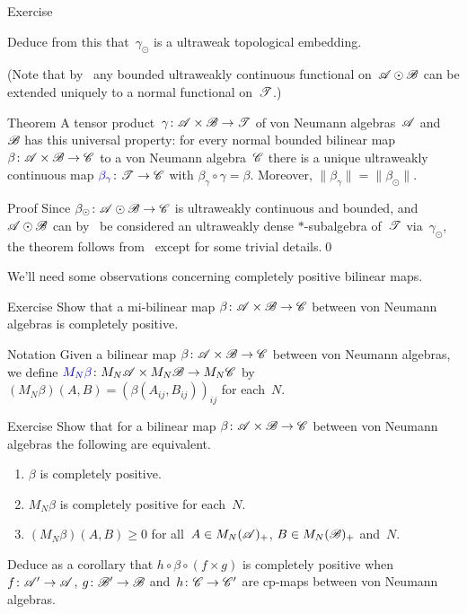 \documentclass[a]{subfiles}
\begin{document}
\begin{parsec}
\begin{point}{Exercise}
\begin{enumerate}
Deduce from this that~$\gamma_\odot$ is a ultraweak topological embedding.

(Note that by~ any 
bounded ultraweakly continuous functional
on~$\mathscr{A}\odot\mathscr{B}$ can be extended uniquely
to a normal functional on~$\mathscr{T}$.)
\end{enumerate}
\end{point}
\begin{point}{Theorem}%
A tensor product~$\gamma\colon \mathscr{A}\times\mathscr{B}\to\mathscr{T}$
of von Neumann algebras~$\mathscr{A}$ and~$\mathscr{B}$
has this universal property:
for every normal bounded bilinear map $\beta\colon \mathscr{A}\times \mathscr{B}\to\mathscr{C}$
to a von Neumann algebra~$\mathscr{C}$
there is a unique ultraweakly continuous
map  $\Define{\beta_\gamma}\colon \scrT
\to \scrC$ with $\beta_\gamma\circ \gamma  = \beta$.
Moreover, $\|\beta_\gamma\|=\|\beta_\odot\|$.
\begin{point}{Proof}%
Since $\beta_\odot\colon \mathscr{A}\odot\mathscr{B}\to\mathscr{C}$
is ultraweakly continuous and bounded,
and
$\mathscr{A}\odot\mathscr{B}$
can by~ be
considered an ultraweakly dense $*$-subalgebra
of~$\mathscr{T}$ via~$\gamma_\odot$,
the theorem follows from~
except for some trivial details.\qed
\end{point}
\end{point}
\end{parsec}%
\begin{parsec}%
\begin{point}%
We'll need some observations
concerning completely positive bilinear maps.
\end{point}
\begin{point}{Exercise}%
Show that a mi-bilinear
map $\beta\colon \mathscr{A}\times\mathscr{B}\to\mathscr{C}$ between von Neumann 
algebras is completely positive.
\end{point}
\begin{point}{Notation}%
Given a bilinear map
$\beta\colon \mathscr{A}\times\mathscr{B}\to\mathscr{C}$
between von Neumann algebras,
we define
$\Define{M_N\beta}\colon M_N\scrA\times M_N\scrB\to M_N\scrC$
by  $(M_N\beta)(A,B) = 
(\beta(A_{ij},B_{ij}))_{ij}$
for each~$N$.
\end{point}
\begin{point}[cp-bilinear]{Exercise}%
Show that for a bilinear map $\beta\colon \mathscr{A}\times\mathscr{B}\to\mathscr{C}$
between von Neumann algebras
the following are equivalent.
\begin{enumerate}
\item
$\beta$ is completely positive.
\item
$M_N\beta$ is completely positive
for each~$N$.
\item
$(M_N\beta)(A,B)\geq 0$
for all~$A\in M_N(\mathscr{A})_+$, $B\in M_N(\mathscr{B})_+$ and~$N$.
\end{enumerate}
Deduce 
as a corollary that $h\circ \beta \circ (f\times g)$
is completely positive
when~$f\colon \mathscr{A}'\to\mathscr{A}$,
$g\colon \mathscr{B}'\to\mathscr{B}$
and~$h\colon \mathscr{C}\to\mathscr{C}'$
are cp-maps between von Neumann algebras.
\end{point}
\end{parsec}
\end{document}
